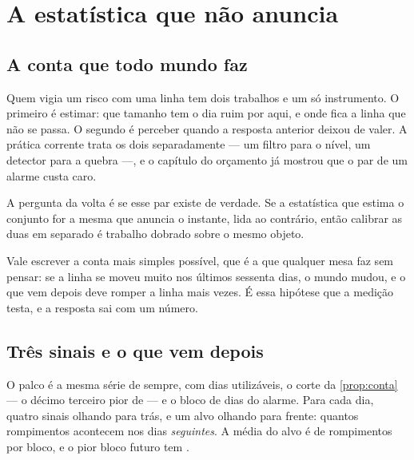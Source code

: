 %
%

\chapter{A estatística que não anuncia}
\label{cap:estabilidade}

\section{A conta que todo mundo faz}

Quem vigia um risco com uma linha tem dois trabalhos e um só instrumento. O primeiro é estimar:
que tamanho tem o dia ruim por aqui, e onde fica a linha que não se passa. O segundo é perceber
quando a resposta anterior deixou de valer. A prática corrente trata os dois separadamente
--- um filtro para o nível, um detector para a quebra ---, e o capítulo do orçamento já mostrou que o par de
um alarme custa caro.

A pergunta da volta é se esse par existe de verdade. Se a estatística que estima o conjunto for
a mesma que anuncia o instante, lida ao contrário, então calibrar as duas em separado é trabalho
dobrado sobre o mesmo objeto.

Vale escrever a conta mais simples possível, que é a que qualquer mesa faz sem pensar: se a
linha se moveu muito nos últimos sessenta dias, o mundo mudou, e o que vem depois deve romper a
linha mais vezes. É essa hipótese que a medição testa, e a resposta sai com um número.

\section{Três sinais e o que vem depois}

O palco é a mesma série de sempre, com \numEstabilidadeDias{} dias utilizáveis, o corte da \cref{prop:conta} --- o décimo terceiro pior de \numCorteJanela{} --- e o bloco de
\numBlocoDias{} dias do alarme. Para cada dia, quatro sinais olhando para trás, e um alvo olhando
para frente: quantos rompimentos acontecem nos \numBlocoDias{} dias \emph{seguintes}. A média do
alvo é de \numEstabilidadeFuturoMedio{} rompimentos por bloco, e o pior bloco futuro tem
\numEstabilidadeFuturoPior.

